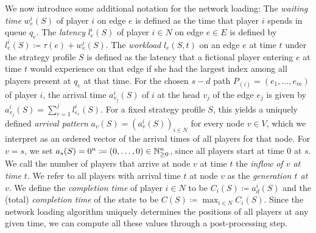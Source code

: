 We now introduce some additional notation for the network loading:
The \emph{waiting time} $w_e^i(S)$ of player $i$ on edge $e$ is defined as the time that player $i$ spends in queue $q_e$. The \emph{latency} $l_e^i(S)$ of player $i\in N$ on edge $e \in E$ is defined by $l_e^i(S) \coloneqq \tau(e) + w^i_e(S)$. 
The \emph{workload} $l_{e}(S,t)$ on an edge $e$ at time $t$ under the strategy profile $S$ is defined as the latency that a fictional player entering $e$ at time $t$ would experience on that edge if she had the largest index among all players present at $q_e$ at that time.
For the chosen $s-d$ path $P_{(i)} = (e_1,\ldots, e_m)$ of player $i$, the arrival time $a_{v_j}^i(S)$ of $i$ at the head $v_j$ of the edge $e_j$ is given by $a_{v_j}^i(S) = \sum_{r=1}^{j} l_{e_r}^i(S)$. For a fixed strategy profile $S$, this yields a uniquely defined \emph{arrival pattern} $a_v(S) = (a_v^i(S))_{i \in N}$ for every node $v\in V$, which we interpret as an ordered vector of the arrival times of all players for that node. For $v=s$, we set $a_s(S)= 0^n\coloneq(0,\ldots,0)\in \mathbb{N}_{\geq 0}^n$, since all players start at time $0$ at $s$. We call the number of players that arrive at node $v$ at time $t$ the \emph{inflow of $v$ at time $t$}. We refer to all players with arrival time $t$ at node $v$ as the \emph{generation $t$ at $v$}. We define the \emph{completion time} of player $i\in N$ to be $C_i(S)\coloneq a_{d}^i(S)$ and the (total) \emph{completion time} of the state to be $C(S)\coloneq \max_{i\in N} C_i(S)$. Since the network loading algorithm uniquely determines the positions of all players at any given time, we can compute all these values through a post-processing step.

